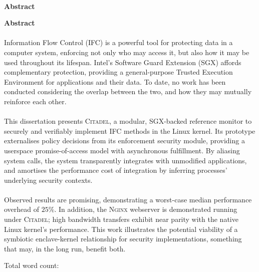 \newpage

\ifblind 

\begin{center}
    \vspace*{1mm}
    \noindent
    \huge
    \dissertationtitle \\
    \vspace{18pt} 
    {\large \bf \sc Abstract}
    \vspace{12pt} 
\end{center}

\else
{\Huge \bf Abstract}
\vspace{24pt} 
\fi


\paragraph{} Information Flow Control (IFC) is a powerful tool for protecting data in a computer system, enforcing not only who may access it, but also how it may be used throughout its lifespan. Intel's Software Guard Extension (SGX) affords complementary protection, providing a general-purpose Trusted Execution Environment for applications and their data. To date, no work has been conducted considering the overlap between the two, and how they may mutually reinforce each other.

\paragraph{} This dissertation presents \textsc{Citadel}, a modular, SGX-backed reference monitor to securely and verifiably implement IFC methods in the Linux kernel. Its prototype externalises policy decisions from its enforcement security module, providing a userspace promise-of-access model with asynchronous fulfillment. By aliasing system calls, the system transparently integrates with unmodified applications, and amortises the performance cost of integration by inferring processes' underlying security contexts.

\paragraph{} Observed results are promising, demonstrating a worst-case median performance overhead of $25\%$. In addition, the \textsc{Nginx} webserver is demonstrated running under \textsc{Citadel}; high bandwidth transfers exhibit near parity with the native Linux kernel's performance. This work illustrates the potential viability of a symbiotic enclave-kernel relationship for security implementations, something that may, in the long run, benefit both.



\newpage

\vspace*{\fill}

\ifblind
Total word count: \wordcount
\fi
